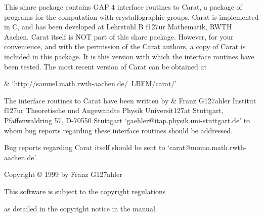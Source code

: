 
This share package contains GAP 4 interface routines to Carat, 
a package of programs for the computation with crystallographic
groups. Carat is implemented in C, and has been developed at Lehrstuhl
B f\accent127ur Mathematik, RWTH Aachen. Carat itself is NOT part of this 
share package. However, for your convenience, and with the permission
of the Carat authors, a copy of Carat is included in this package. 
It is this version with which the interface routines have been
tested. The most recent version of Carat can be obtained at

\beginitems
&
`http://samuel.math.rwth-aachen.de/~LBFM/carat/'
\enditems
 
The {\GAP} interface routines to Carat have been written by
\beginitems
&
Franz G\accent127ahler \hfill\break
Institut f\accent127ur Theoretische und Angewandte Physik \hfill\break
Universit\accent127at Stuttgart, Pfaffenwaldring 57, 
D-70550 Stuttgart\hfill\break
`gaehler@itap.physik.uni-stuttgart.de'
\enditems
to whom bug reports regarding these interface routines should be
addressed. 

Bug reports regarding Carat itself should be sent to
`carat@momo.math.rwth-aachen.de'.

\vfill
\centerline{Copyright {\copyright} 1999 by Franz G\accent127ahler}\bigskip
\smallskip
\centerline{This software is subject to the {\GAP} copyright regulations}
\centerline{as detailed in the copyright notice in the {\GAP} manual.}


